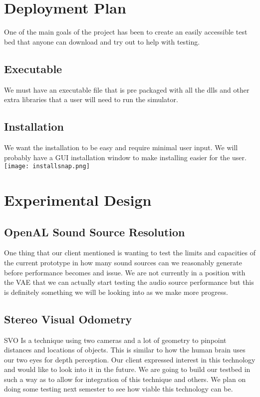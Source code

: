 \documentclass{scrreprt}
\begin{document}
\chapter{Deployment Plan}
One of the main goals of the project has been to create an easily accessible test bed that anyone can download and try out to help with testing.
\section{Executable}
We must have an executable file that is pre packaged with all the dlls and other extra libraries that a user will need to run the simulator.
\section{Installation} We want the installation to be easy and require minimal user input. We will probably have a GUI installation window to make installing easier for the user.\\
\texttt{[image: installsnap.png]}

\chapter{Experimental Design}
\section{OpenAL Sound Source Resolution}
One thing that our client mentioned is wanting to test the limits and capacities of the current prototype in how many sound sources can we reasonably generate before performance becomes and issue. We are not currently in a position with the VAE that we can actually start testing the audio source performance but this is definitely something we will be looking into as we make more progress.
\section{Stereo Visual Odometry}
SVO Is a technique using two cameras and a lot of geometry to pinpoint distances and locations of objects. This is similar to how the human brain uses our two eyes for depth perception. Our client expressed interest in this technology and would like to look into it in the future. We are going to build our testbed in such a way as to allow for integration of this technique and others. We plan on doing some testing next semester to see how viable this technology can be.
\end{document}
